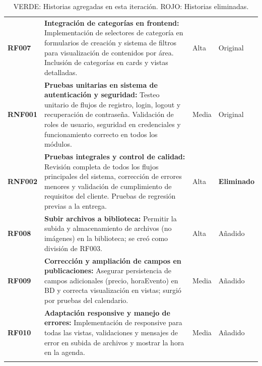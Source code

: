 \begin{longtable}{|l||p{7cm}|l|l|}
\textbf{RF007} & 
\textbf{Integración de categorías en frontend:} Implementación de selectores de categoría en formularios de creación y sistema de filtros para visualización de contenidos por área. Inclusión de categorías en cards y vistas detalladas. & Alta & Original \\

\textbf{RNF001} & 
\textbf{Pruebas unitarias en sistema de autenticación y seguridad:} Testeo unitario de flujos de registro, login, logout y recuperación de contraseña. Validación de roles de usuario, seguridad en credenciales y funcionamiento correcto en todos los módulos. & Media & Original \\

\color{Mahogany}
\textbf{RNF002} & 
\textbf{Pruebas integrales y control de calidad:} Revisión completa de todos los flujos principales del sistema, corrección de errores menores y validación de cumplimiento de requisitos del cliente. Pruebas de regresión previas a la entrega. & Alta & \textbf{Eliminado} \\

\color{ForestGreen}
\textbf{RF008} & 
\textbf{Subir archivos a biblioteca:} Permitir la subida y almacenamiento de archivos (no imágenes) en la biblioteca; se creó como división de RF003. & Alta & Añadido  \\

\color{ForestGreen}
\textbf{RF009} & 
\textbf{Corrección y ampliación de campos en publicaciones:} Asegurar persistencia de campos adicionales (precio, horaEvento) en BD y correcta visualización en vistas; surgió por pruebas del calendario. & Media & Añadido  \\

\color{ForestGreen}
\textbf{RF010} & 
\textbf{Adaptación responsive y manejo de errores:} Implementación de responsive para todas las vistas, validaciones y mensajes de error en subida de archivos y mostrar la hora en la agenda. & Media & Añadido \\

\hline
\caption{\color{ForestGreen}VERDE: Historias agregadas en esta iteración. \color{Mahogany}ROJO: Historias eliminadas.}
\label{ProductBacklog}
\end{longtable}


